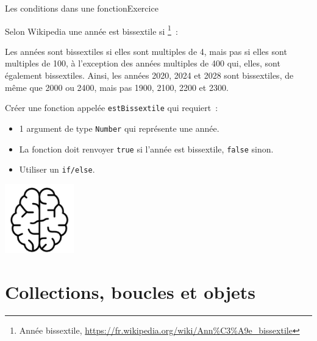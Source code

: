 \documentclass{beamer}
\begin{document}
    \begin{frame}{Les conditions dans une fonction}{Exercice \execcounterdispinc{}}
        \begin{footnotesize}
            Selon Wikipedia une année est bissextile si \footnote{Année bissextile, \url{https://fr.wikipedia.org/wiki/Ann\%C3\%A9e_bissextile}}~:
            \begin{textit}
                Les années sont bissextiles si elles sont multiples de 4, mais pas si elles sont multiples de 100, à l'exception des années multiples de 400 qui, elles, sont également bissextiles.
                Ainsi, les années 2020, 2024 et 2028 sont bissextiles, de même que 2000 ou 2400, mais pas 1900, 2100, 2200 et 2300.
            \end{textit}
            \bigbreak
            Créer une fonction appelée \lstinline{estBissextile} qui requiert~:
            \begin{itemize}
                \item 1 argument de type \lstinline{Number} qui représente une année.
                \item La fonction doit renvoyer \lstinline{true} si l'année est bissextile, \lstinline{false} sinon.
                \item Utiliser un \lstinline{if/else}.
            \end{itemize}
        \end{footnotesize}
        \bigbreak
        \centering
        \includegraphics[width=3cm]{image/intelligence}
    \end{frame}


    \section{Collections, boucles et objets}\label{sec:collections-loops-objects}
\end{document}
